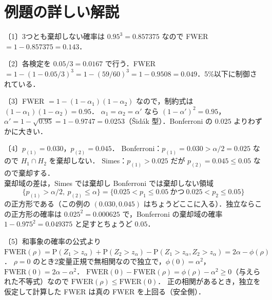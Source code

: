 \documentclass[a4paper,11pt,openany]{ltjsbook}
\newenvironment{kaitou}[1]{%
  \par\medskip\noindent
  \begin{tcolorbox}[enhanced,breakable,colback=bkgray!3,colframe=bkgray!60,boxrule=0.4pt,
    left=4pt,right=4pt,top=2pt,bottom=2pt,arc=1pt,
    title={\cref{#1}の解答},fonttitle=\bfseries\small,coltitle=white,colbacktitle=bkgray!80]}%
  {\end{tcolorbox}\par}
\newcommand{\Prob}{\mathrm{P}}
\begin{document}
\section{例題の詳しい解説}\label{sec:m08-kaisetsu}
\begin{kaitou}{reidai:m08-1}
〔1〕3つとも棄却しない確率は $0.95^3=0.857375$ なので FWER $=1-0.857375=0.143$．

〔2〕各検定を $0.05/3=0.0167$ で行う．FWER $=1-(1-0.05/3)^3=1-(59/60)^3=1-0.9508=0.049$．5\%以下に制御されている．

〔3〕FWER $=1-(1-\alpha_1)(1-\alpha_2)$ なので，制約式は $(1-\alpha_1)(1-\alpha_2)=0.95$．
$\alpha_1=\alpha_2=\alpha'$ なら $(1-\alpha')^2=0.95$，$\alpha'=1-\sqrt{0.95}=1-0.9747=0.0253$（Šidák 型）．Bonferroni の $0.025$ よりわずかに大きい．

〔4〕$p_{(1)}=0.030$，$p_{(2)}=0.045$．
Bonferroni：$p_{(1)}=0.030>\alpha/2=0.025$ なので $H_1\cap H_2$ を棄却しない．
Simes：$p_{(1)}>0.025$ だが $p_{(2)}=0.045\le0.05$ なので棄却する．\\
棄却域の差は，Simes では棄却し Bonferroni では棄却しない領域
\[
\{p_{(1)}>\alpha/2,\ p_{(2)}\le\alpha\}=\{0.025<p_1\le0.05\ \text{かつ}\ 0.025<p_2\le0.05\}
\]
の正方形である（この例の $(0.030,0.045)$ はちょうどここに入る）．独立ならこの正方形の確率は $0.025^2=0.000625$ で，Bonferroni の棄却域の確率 $1-0.975^2=0.049375$ と足すとちょうど $0.05$．

〔5〕和事象の確率の公式より
$\mathrm{FWER}(\rho)=\Prob(Z_1>z_\alpha)+\Prob(Z_2>z_\alpha)-\Prob(Z_1>z_\alpha,Z_2>z_\alpha)=2\alpha-\phi(\rho)$．
$\rho=0$ のとき2変量正規で無相関なので独立で，$\phi(0)=\alpha^2$，$\mathrm{FWER}(0)=2\alpha-\alpha^2$．
$\mathrm{FWER}(0)-\mathrm{FWER}(\rho)=\phi(\rho)-\alpha^2\ge0$（与えられた不等式）なので $\mathrm{FWER}(\rho)\le\mathrm{FWER}(0)$．
正の相関があるとき，独立を仮定して計算した FWER は真の FWER を上回る（安全側）．
\end{kaitou}
\end{document}
